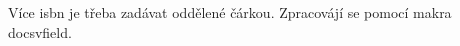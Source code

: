 \documentclass[a4paper,10pt]{article}
\begin{document}
\nocite{*}
Více isbn je třeba zadávat oddělené čárkou. Zpracovájí se pomocí makra docsvfield.
 
\printbibliography[title={Seznam literatury},heading=bibnumbered]
\end{document}
